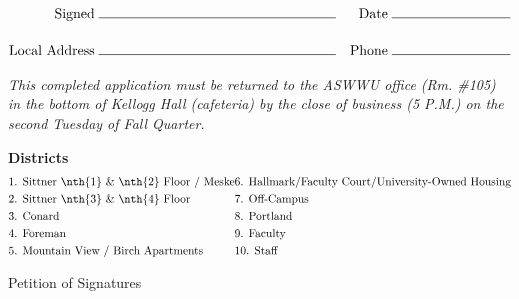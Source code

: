 \vspace*{-8mm}

\begin{align*}
\begin{split}
\textrm{Signed} \; &\rule{6cm}{0.15mm}\\[+4mm]
\textrm{Local Address} \; &\rule{6cm}{0.15mm}
\end{split}
\quad
\begin{split}
\textrm{Date} \; &\rule{3cm}{0.15mm}\\[+4mm]
\textrm{Phone} \; &\rule{3cm}{0.15mm}
\end{split}
\end{align*}
\singlespacing

\vspace*{-5mm}

\textit{This completed application must be returned to the ASWWU office (Rm. \#105) in the bottom of Kellogg Hall (cafeteria) by the close of business (5 P.M.) on the second Tuesday of Fall Quarter.}

\vspace*{3mm}

\textbf{Districts}
\begin{align*}
\begin{split}
&\textrm{1. Sittner \nth{1} \& \nth{2} Floor / Meske}\\
&\textrm{2. Sittner \nth{3} \& \nth{4} Floor}\\
&\textrm{3. Conard}\\
&\textrm{4. Foreman}\\
&\textrm{5. Mountain View / Birch Apartments}\\
\end{split}
\begin{split}
&\textrm{6. Hallmark/Faculty Court/University-Owned Housing}\\
&\textrm{7. Off-Campus}\\
&\textrm{8. Portland}\\
&\textrm{9. Faculty}\\
&\textrm{10. Staff}\\
\end{split}
\end{align*}

\newpage

\begin{center}
\Large{Petition of Signatures}
\end{center}

\normalsize

\vspace*{5mm}

